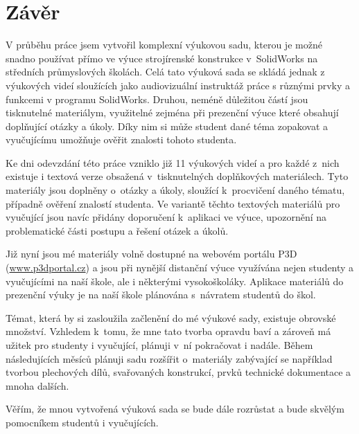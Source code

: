 \chapter*{Závěr}
V průběhu práce jsem vytvořil komplexní výukovou sadu, kterou je možné snadno používat přímo ve výuce strojírenské konstrukce v~SolidWorks na středních průmyslových školách.
Celá tato výuková sada se skládá jednak z výukových videí sloužících jako audiovizuální instruktáž práce s různými prvky a funkcemi v programu SolidWorks.
Druhou, neméně důležitou částí jsou tisknutelné materiálym, využitelné zejména při prezenční výuce které obsahují doplňující otázky a úkoly.
Díky nim si může student dané téma zopakovat a vyučujícímu umožňuje ověřit znalosti tohoto studenta. 

Ke dni odevzdání této práce vzniklo již 11 výukových videí a pro každé z~nich existuje i textová verze obsažená v~tisknutelných doplňkových materiálech.
Tyto materiály jsou doplněny o~otázky a úkoly, sloužící k~procvičení daného tématu, případně ověření znalostí studenta.
Ve variantě těchto textových materiálů pro vyučující jsou navíc přidány doporučení k~aplikaci ve výuce, upozornění na problematické části postupu a řešení otázek a úkolů.

Již nyní jsou mé materiály volně dostupné na webovém portálu P3D (\href{https://www.p3dportal.cz}{www.p3dportal.cz}) a jsou při nynější distanční výuce využívána nejen studenty a vyučujícími na naší škole, ale i některými vysokoškoláky.
Aplikace materiálů do prezenční výuky je na naší škole plánována s~návratem studentů do škol.

Témat, která by si zasloužila začlenění do mé výukové sady, existuje obrovské množství.
Vzhledem k~tomu, že mne tato tvorba opravdu baví a zároveň má užitek pro studenty i vyučující, plánuji v~ní pokračovat i nadále.
Během následujících měsíců plánuji sadu rozšířit o~materiály zabývající se například tvorbou plechových dílů, svařovaných konstrukcí, prvků technické dokumentace a mnoha dalších.

Věřím, že mnou vytvořená výuková sada se bude dále rozrůstat a bude skvělým pomocníkem studentů i vyučujících.
\newpage